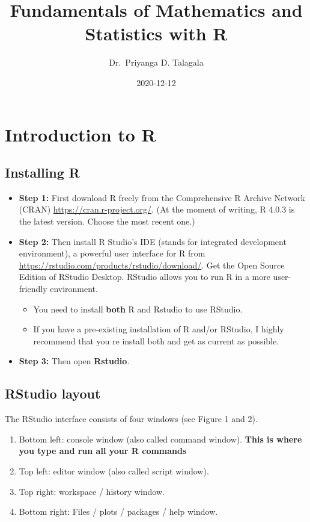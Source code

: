 \documentclass[]{book}
\title{Fundamentals of Mathematics and Statistics with R}
\author{Dr.~Priyanga D. Talagala}
\date{2020-12-12}
\begin{document}
\maketitle

{
\setcounter{tocdepth}{1}
\tableofcontents
}
\hypertarget{intro}{%
\chapter{Introduction to R}\label{intro}}


\hypertarget{installing-r}{%
\section{Installing R}\label{installing-r}}

\begin{itemize}
\item
  \textbf{Step 1:} First download R freely from the Comprehensive R Archive Network (CRAN) \url{https://cran.r-project.org/}.
  (At the moment of writing, R 4.0.3 is the latest version. Choose the most recent one.)
\item
  \textbf{Step 2:} Then install R Studio's IDE (stands for integrated development environment), a powerful user interface for R from \url{https://rstudio.com/products/rstudio/download/}. Get the Open Source Edition of RStudio Desktop. RStudio allows you to run R in a more user-friendly environment.

  \begin{itemize}
  \item
    You need to install \textbf{both} R and Rstudio to use RStudio.
  \item
    If you have a pre-existing installation of R and/or RStudio, I highly recommend that you re install both and get as current as possible.
  \end{itemize}
\item
  \textbf{Step 3:} Then open \textbf{Rstudio}.
\end{itemize}

\hypertarget{rstudio-layout}{%
\section{RStudio layout}\label{rstudio-layout}}

The RStudio interface consists of four windows (see Figure 1 and 2).

\begin{enumerate}
\def\labelenumi{\arabic{enumi}.}
\item
  Bottom left: console window (also called command window). \textbf{This is where you type and run all your R commands}
\item
  Top left: editor window (also called script window).
\item
  Top right: workspace / history window.
\item
  Bottom right: Files / plots / packages / help window.
\end{enumerate}
\end{document}
